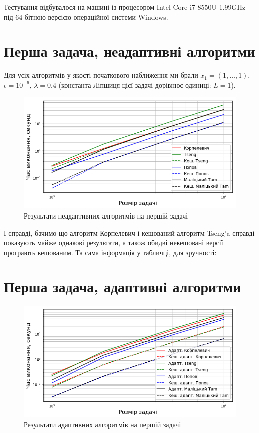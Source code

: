 Тестування відбувалося на машині із процесором Intel Core i7-8550U 1.99GHz під 64-бітною версією операційної системи Windows.

\section{Перша задача, неадаптивні алгоритми}

Для усіх алгоритмів у якості початкового наближення ми брали $x_1 = (1, \dots, 1)$, $\epsilon = 10^{-6}$, $\lambda = 0.4$ (константа Ліпшиця цієї задачі дорівнює одиниці: $L = 1$). 

\begin{figure}[H]
    \centering
    \includegraphics[width=\textwidth]{img/1/time.png}
    \caption{Результати неадаптивних алгоритмів на першій задачі}
\end{figure}

І справді, бачимо що алгоритм Корпелевич і кешований алгоритм Tseng'a справді показують майже однакові результати, а також обидві некешовані версії програють кешованим. Та сама інформація у табличці, для зручності:





\section{Перша задача, адаптивні алгоритми}

\begin{figure}[H]
    \centering
    \includegraphics[width=\textwidth]{img/1/adapt/time.png}
    \caption{Результати адаптивних алгоритмів на першій задачі}
\end{figure}

